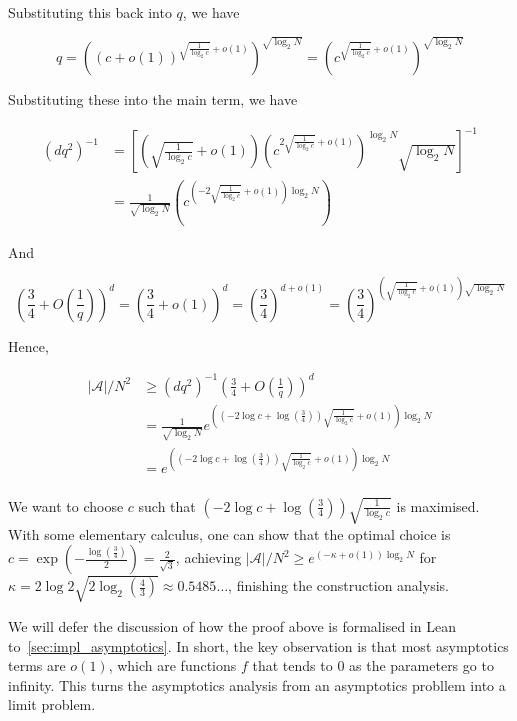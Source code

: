 Substituting this back into \(q\), we have

\[
  q = \left((c + o(1))^{\sqrt{\frac{1}{\log_2 c}} + o(1)}\right)^{\sqrt{\log_2 N}} = \left(c^{\sqrt{\frac{1}{\log_2 c}} + o(1)}\right)^{\sqrt{\log_2 N}}
\]

Substituting these into the main term, we have

\begin{align*}
  (dq^2)^{-1}
  &= \left[\left(\sqrt{\frac{1}{\log_2 c}} + o(1)\right)\left(c^{2\sqrt{\frac{1}{\log_2 c}} + o(1)}\right)^{\log_2 N}\sqrt{\log_2 N}\right]^{-1} \\
  &= \frac{1}{\sqrt{\log_2 N}}\left(c^{\left(-2\sqrt{\frac{1}{\log_2 c}} + o(1)\right)\log_2 N}\right)
\end{align*}

And

\[
  \left(\frac{3}{4} + O\left(\frac{1}{q}\right)\right)^d
  = \left(\frac{3}{4} + o(1)\right)^d
  = \left(\frac{3}{4}\right)^{d + o(1)}
  = \left(\frac{3}{4}\right)^{\left(\sqrt{\frac{1}{\log_2 c}} + o(1)\right)\sqrt{\log_2 N}}
\]

Hence,

\begin{align*}
  |\mathcal{A}| / N^2
  &\geq (dq^2)^{-1}\left(\frac{3}{4} + O\left(\frac{1}{q}\right)\right)^d \\
  &= \frac{1}{\sqrt{\log_2 N}} e^{\left(\left(-2\log c + \log\left(\frac{3}{4}\right)\right)\sqrt{\frac{1}{\log_2 c}} + o(1)\right) \log_2 N} \\
  &= e^{\left(\left(-2\log c + \log\left(\frac{3}{4}\right)\right)\sqrt{\frac{1}{\log_2 c}} + o(1)\right) \log_2 N} \\
\end{align*}

We want to choose \(c\) such that \(\left(-2\log c + \log\left(\frac{3}{4}\right)\right)\sqrt{\frac{1}{\log_2 c}}\) is maximised. With some elementary calculus, one can show that the optimal choice is \(c = \exp\left(-\frac{\log\left(\frac{3}{4}\right)}{2}\right) = \frac{2}{\sqrt{3}}\), achieving \(|\mathcal{A}|/N^2 \geq e^{(-\kappa + o(1))\log_2 N}\) for \(\kappa = 2\log 2\sqrt{2\log_2\left(\frac{4}{3}\right)} \approx 0.5485 \ldots\), finishing the construction analysis.

We will defer the discussion of how the proof above is formalised in Lean to~\cref{sec:impl_asymptotics}. In short, the key observation is that most asymptotics terms are \(o(1)\), which are functions \(f\) that tends to \(0\) as the parameters go to infinity. This turns the asymptotics analysis from an asymptotics probllem into a limit problem.
